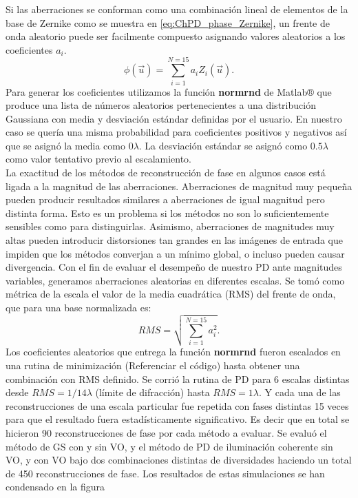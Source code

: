 Si las aberraciones se conforman como una combinación lineal de
elementos de la base de Zernike como se muestra en
\ref{eq:ChPD_phase_Zernike}, un frente de onda aleatorio puede ser
facilmente compuesto asignando valores aleatorios a los coeficientes $a_i$. 
\begin{equation}
\label{eq:ChPD_phase_Zernike}
\phi(\vec{u}) = \sum_{i=1}^{N=15}a_iZ_i(\vec{u}). 
\end{equation}
Para generar los coeficientes utilizamos la función \textbf{normrnd}
de Matlab$\circledR$ que produce una lista de números aleatorios pertenecientes
 a una distribución Gaussiana con media y desviación
estándar definidas por el usuario.  En nuestro caso se quería una
misma probabilidad para coeficientes positivos y negativos así que se asignó la media
como $0\lambda$. La desviación estándar se asignó como $0.5\lambda$ como valor
tentativo previo al escalamiento.\\
La exactitud de los métodos de reconstrucción de fase en algunos casos
está ligada a la magnitud de las aberraciones. Aberraciones de
magnitud muy pequeña pueden producir resultados similares a
aberraciones de igual magnitud pero distinta forma. Esto es un
problema si los métodos no son lo suficientemente sensibles como para
distinguirlas. Asimismo, aberraciones de magnitudes muy altas pueden
introducir distorsiones tan grandes en las imágenes de entrada que
impiden que los métodos converjan a un mínimo global, o incluso pueden
causar divergencia. Con el fin de evaluar el desempeño de nuestro
PD ante magnitudes variables, generamos aberraciones aleatorias en diferentes
escalas. Se tomó como métrica de la escala el valor de la media
cuadrática (RMS) del frente de onda, que para una base normalizada es:
$$RMS =  \sqrt{\sum_{i=1}^{N=15}a_i^2 }.$$
Los coeficientes aleatorios que entrega la función \textbf{normrnd}
fueron escalados en una rutina de minimización (Referenciar el código)
hasta obtener una combinación con RMS definido. 
Se corrió la rutina de PD para 6 escalas distintas desde $RMS = 1/14\lambda$ (límite de
difracción) hasta $RMS = 1\lambda$. Y cada una de las reconstrucciones
de una escala particular fue repetida con fases distintas 15 veces
para que el resultado fuera estadísticamente significativo. Es decir
que en total se hicieron  90 reconstrucciones de fase por cada método
a evaluar. Se evaluó el método de GS con y sin VO, y el método de PD
de iluminación coherente sin VO, y con VO bajo dos combinaciones
distintas de diversidades haciendo un total de 450 reconstrucciones de
fase.  
Los resultados de estas simulaciones se han condensado en la figura
